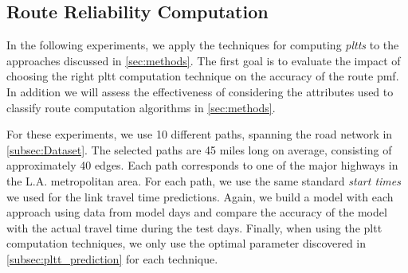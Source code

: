 \vspace{-0.1in}
\subsection{Route Reliability Computation}
In the following experiments, we apply the techniques for computing
\textit{pltts} to the approaches discussed in \cref{sec:methods}. The first goal
is to evaluate the impact of choosing the right pltt computation technique on
the accuracy of the route pmf. In addition we will assess the effectiveness of
considering the attributes used to classify route computation algorithms in
\cref{sec:methods}.

For these experiments, we use 10 different paths, spanning the road network in
\ref{subsec:Dataset}. The selected paths are 45 miles long on average, consisting of
approximately 40 edges. Each path corresponds to one of the major highways in the L.A. metropolitan area. For each path, we use the same standard \textit{start
times} we used for the link travel time predictions. Again, we build a model
with each approach using data from model days and compare the accuracy of the
model with the actual travel time during the test days. Finally, when using the
pltt computation techniques, we only use the optimal parameter discovered in
\cref{subsec:pltt_prediction} for each technique.


